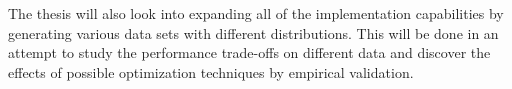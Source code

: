 

The thesis will also look into expanding all of the implementation capabilities by generating various data sets with different distributions. This will be done in an attempt to study the performance trade-offs on different data and discover the effects of possible optimization techniques by empirical validation.  




\newpage

